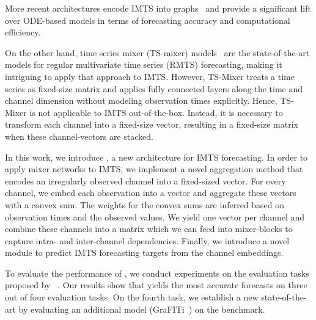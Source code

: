 More recent architectures encode IMTS into graphs~\cite{Yalavarthi2023.Forecasting,Zhang.Irregular}
and provide a significant lift over ODE-based models in terms of forecasting accuracy and computational efficiency. 

On the other hand, time series mixer (TS-mixer) models~\cite{Ekambaram2023.TSMixer,Chen2023.TSMixer} are the state-of-the-art models for regular multivariate time series (RMTS) forecasting, making it intriguing 
to apply that approach to IMTS.\@ 
However, TS-Mixer treats a time series as fixed-size matrix and applies fully connected layers along the time and channel dimension without modeling observation times explicitly. 
Hence, TS-Mixer is not applicable to IMTS out-of-the-box. 
Instead, it is necessary to transform each channel into a fixed-size vector, resulting in a fixed-size matrix when these channel-vectors are stacked.

In this work, we introduce \model{}, a new architecture for IMTS forecasting. In order to apply mixer networks to IMTS, we implement a novel aggregation method that encodes an irregularly observed channel 
into a fixed-sized vector. For every channel, we embed each observation into a vector and aggregate these vectors with a convex sum. 
The weights for the convex sums are inferred based on observation times and the observed values. 
We yield one vector per channel and combine these channels into a matrix which we can feed into mixer-blocks to capture intra- and inter-channel dependencies.
Finally, we introduce a novel module to predict IMTS forecasting targets from the channel embeddings.

To evaluate the performance of \model{}, we conduct experiments on the evaluation tasks proposed by \citeauthor{Zhang.Irregular}~\cite{Zhang.Irregular}.
Our results show that \model{} yields the most accurate forecasts on three out of four evaluation tasks. 
On the fourth task, we establish a new state-of-the-art by evaluating an additional model (GraFITi~\cite{Yalavarthi2023.Forecasting}) on the benchmark. 

